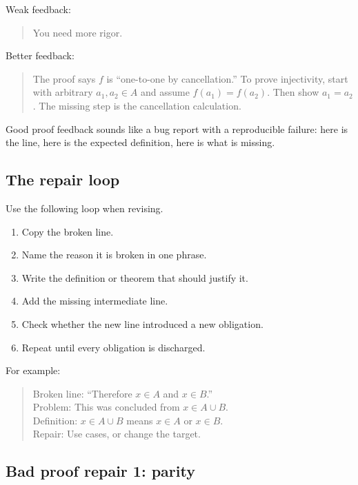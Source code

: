 Weak feedback:

\begin{quote}
You need more rigor.
\end{quote}

Better feedback:

\begin{quote}
The proof says $f$ is ``one-to-one by cancellation.'' To prove injectivity, start with arbitrary $a_1,a_2\in A$ and assume $f(a_1)=f(a_2)$. Then show $a_1=a_2$. The missing step is the cancellation calculation.
\end{quote}

\begin{intuitionbox}
Good proof feedback sounds like a bug report with a reproducible failure: here is the line, here is the expected definition, here is what is missing.
\end{intuitionbox}

\subsection{The repair loop}

Use the following loop when revising.

\begin{enumerate}
\item Copy the broken line.
\item Name the reason it is broken in one phrase.
\item Write the definition or theorem that should justify it.
\item Add the missing intermediate line.
\item Check whether the new line introduced a new obligation.
\item Repeat until every obligation is discharged.
\end{enumerate}

For example:

\begin{quote}
Broken line: ``Therefore $x\in A$ and $x\in B$.''\\
Problem: This was concluded from $x\in A\cup B$.\\
Definition: $x\in A\cup B$ means $x\in A$ or $x\in B$.\\
Repair: Use cases, or change the target.
\end{quote}

\subsection{Bad proof repair 1: parity}

